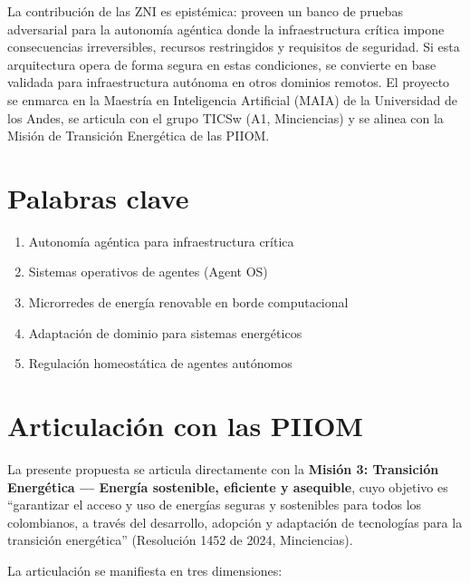 \documentclass[12pt,letterpaper]{article}
\begin{document}
La contribuci\'on de las ZNI es epist\'emica: proveen un banco de pruebas adversarial para la autonom\'ia ag\'entica donde la infraestructura cr\'itica impone consecuencias irreversibles, recursos restringidos y requisitos de seguridad. Si esta arquitectura opera de forma segura en estas condiciones, se convierte en base validada para infraestructura aut\'onoma en otros dominios remotos. El proyecto se enmarca en la Maestr\'ia en Inteligencia Artificial (MAIA) de la Universidad de los Andes, se articula con el grupo TICSw (A1, Minciencias) y se alinea con la Misi\'on de Transici\'on Energ\'etica de las PIIOM.

\section{Palabras clave}

\begin{enumerate}
\item Autonom\'ia ag\'entica para infraestructura cr\'itica
\item Sistemas operativos de agentes (Agent OS)
\item Microrredes de energ\'ia renovable en borde computacional
\item Adaptaci\'on de dominio para sistemas energ\'eticos
\item Regulaci\'on homeost\'atica de agentes aut\'onomos
\end{enumerate}

\section{Articulaci\'on con las PIIOM}

La presente propuesta se articula directamente con la \textbf{Misi\'on 3: Transici\'on Energ\'etica --- Energ\'ia sostenible, eficiente y asequible}, cuyo objetivo es ``garantizar el acceso y uso de energ\'ias seguras y sostenibles para todos los colombianos, a trav\'es del desarrollo, adopci\'on y adaptaci\'on de tecnolog\'ias para la transici\'on energ\'etica'' (Resoluci\'on 1452 de 2024, Minciencias).

La articulaci\'on se manifiesta en tres dimensiones:
\end{document}
